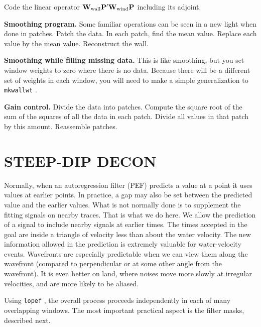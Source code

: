 \begin{exer}
\item
        Code the linear operator
        $ \bold W_{\rm wall} \bold P' \bold W_{\rm wind} \bold P $
        including its adjoint.
\item
        {\bf Smoothing program.}
        Some familiar operations can be seen in a new light when done in patches.
        Patch the data.
        In each patch,
        find the mean value.
        Replace each value by the mean value.
        Reconstruct the wall.
\item
        {\bf Smoothing while filling missing data.}
        This is like smoothing,
        but you set window weights to zero where there is no data.
        Because there will be a
        different set of weights in each window,
        you will need to make a simple generalization to \texttt{mkwallwt} .
\item
        {\bf Gain control.}
        Divide the data into patches.
        Compute the square root of the sum of the squares
        of all the data in each patch.
        Divide all values in that patch by this amount.
        Reassemble patches.
\end{exer}

\section{STEEP-DIP DECON}
\par
Normally,
when
an autoregression filter (PEF) predicts
a value at a point it uses values at earlier points.
In practice,
a gap may also be set between the predicted value
and the earlier values.
What is not normally done is to supplement the fitting
signals on nearby traces.
That is what we do here.
We allow the prediction of a signal to include nearby signals
at earlier times.
The times accepted in the goal are inside a triangle of velocity
less than about the water velocity.
The new information allowed in the prediction
is extremely valuable for water-velocity events.
Wavefronts are especially predictable
when we can view them along the wavefront
(compared to perpendicular or at some other angle from the wavefront).
It is even better on land,
where noises move more slowly at irregular velocities,
and are more likely to be aliased.

\par
Using \texttt{lopef} ,
the overall process proceeds independently
in each of many overlapping windows.
The most important practical aspect is the filter masks, described next.

